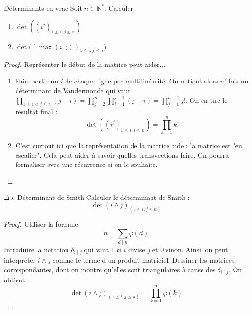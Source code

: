 \documentclass[french,a4paper]{article}
\newcommand{\N}{\mathbb{N}}
\newcommand{\st}{^*}
\theoremstyle{plain}
\theoremstyle{definition}
\theoremstyle{remark}
\begin{document}
\begin{ex}{Déterminants en vrac}
	Soit $n \in \N\st$. Calculer
	\begin{enumerate}
		\item $\det((i^j)_{1\le i,j \le n})$
		\item $\det((\max(i,j))_{1\le i,j \le n}$)
	\end{enumerate}
\end{ex}
\begin{proof}
	Représenter le début de la matrice peut aider...
	\begin{enumerate}
		\item Faire sortir un $i$ de chaque ligne par multilinéarité. On obtient alors $n!$ fois un déterminant de Vandermonde qui vaut $\prod_{1\le i < j \le n} (j-i)=\prod_{j=2}^{n} \prod_{i=1}^{j-1} (j-i)=\prod_{j=1}^{n-1} j!$. On en tire le résultat final : $$ \det((i^j)_{1\le i,j \le n})= \prod_{k=1}^{n} k!$$
		\item C'est surtout ici que la représentation de la matrice aide : la matrice est "en escalier". Cela peut aider à savoir quelles transvections faire. On pourra formaliser avec une récurrence si on le souhaite.
	\end{enumerate}
\end{proof}
\begin{ex}{$\Delta\star$ Déterminant de Smith} Calculer le déterminant de Smith :$$\det\left(i\wedge j\right)_{(1\leqslant i,j\leqslant n)}$$
\end{ex} \begin{proof}
	Utiliser la formule $$n=\sum_{d\mid n}\varphi(d)$$ Introduire la notation $\delta_{i\mid j}$ qui vaut $1$ si $i$ divise $j$ et $0$ sinon. Ainsi, on peut interpréter $i\wedge j$ comme le terme d'un produit matriciel. Dessiner les matrices correspondantes, dont on montre qu'elles sont triangulaires à cause des $\delta_{i\mid j}$. On obtient : $$\det\left(i\wedge j\right)_{(1\leqslant i,j\leqslant n)}=\prod_{k=1}^{n}\varphi(k)$$
\end{proof}
\end{document}
